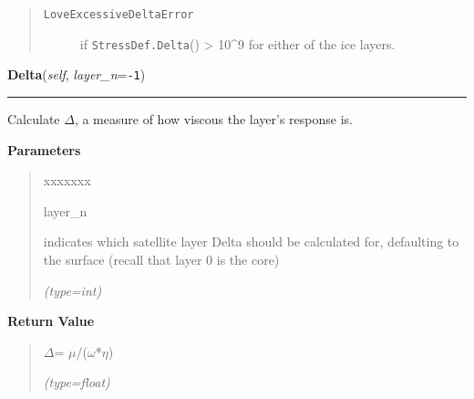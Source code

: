 \begin{boxedminipage}{\funcwidth}
      \begin{quote}
        \begin{description}

          \item[\texttt{LoveExcessiveDeltaError}]

          if \texttt{StressDef.Delta}() {\textgreater} 
          10{\textasciicircum}9 for either of the ice layers.

        \end{description}

      \end{quote}

    \end{boxedminipage}

    \label{satstress:SatStress:StressDef:Delta}

    \vspace{0.5ex}

\hspace{.8\funcindent}\begin{boxedminipage}{\funcwidth}

    \raggedright \textbf{Delta}(\textit{self}, \textit{layer\_n}={\tt -1})

    \vspace{-1.5ex}

    \rule{\textwidth}{0.5\fboxrule}
\setlength{\parskip}{2ex}
    Calculate \(\Delta\), a measure of how viscous the layer's response is.

\setlength{\parskip}{1ex}
      \textbf{Parameters}
      \vspace{-1ex}

      \begin{quote}
        \begin{Ventry}{xxxxxxx}

          \item[layer\_n]

          indicates which satellite layer Delta should be calculated for, 
          defaulting to the surface (recall that layer 0 is the core)

            {\it (type=int)}

        \end{Ventry}

      \end{quote}

      \textbf{Return Value}
    \vspace{-1ex}

      \begin{quote}
      \(\Delta\)= \(\mu\)/(\(\omega\)*\(\eta\))

      {\it (type=float)}

      \end{quote}

    \end{boxedminipage}

